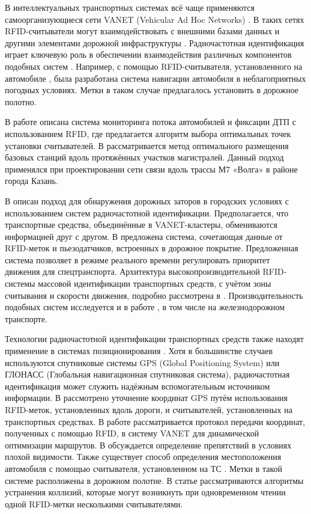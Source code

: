 \documentclass[12pt]{article}
\theoremstyle{definition}
\begin{document}
В интеллектуальных транспортных системах всё чаще применяются самоорганизующиеся сети VANET (Vehicular Ad Hoc Networks) \cite{Al-Shareeda2023, Vishn2016_2}. В таких сетях RFID-считыватели могут взаимодействовать с внешними базами данных и другими элементами дорожной инфраструктуры \cite{Vishn2016, F.Zhu2020}. Радиочастотная идентификация играет ключевую роль в обеспечении взаимодействия различных компонентов подобных систем \cite{Zhang2018, Zhang2019, Shirabur2020, Pawowicz2020, Vishn2013, Vishnevsky2022, Larionov2017, Larionov2018, Vishnevsky2012}. Например, с помощью RFID-считывателя, установленного на автомобиле \cite{CastroGonzalez2025}, была разработана система навигации автомобиля в неблагоприятных погодных условиях. Метки в таком случае предлагалось установить в дорожное полотно.

В работе \cite{Zhang2018} описана система мониторинга потока автомобилей и фиксации ДТП с использованием RFID, где предлагается алгоритм выбора оптимальных точек установки считывателей. В \cite{Amir2022, Vishn2016, Vishn228} рассматривается метод оптимального размещения базовых станций вдоль протяжённых участков магистралей. Данный подход применялся при проектировании сети связи вдоль трассы М7 «Волга» в районе города Казань.

В \cite{Zhang2019} описан подход для обнаружения дорожных заторов в городских условиях с использованием систем радиочастотной идентификации. Предполагается, что транспортные средства, объединённые в VANET-кластеры, обмениваются информацией друг с другом. В \cite{Shirabur2020} предложена система, сочетающая данные от RFID-меток и пьезодатчиков, встроенных в дорожное покрытие. Предложенная система позволяет в режиме реального времени регулировать приоритет движения для спецтранспорта. Архитектура высокопроизводительной RFID-системы массовой идентификации транспортных средств, с учётом зоны считывания и скорости движения, подробно рассмотрена в \cite{Pawowicz2020}. Производительность подобных систем исследуется и в работе \cite{Unterhuber2020}, в том числе на железнодорожном транспорте.

Технологии радиочастотной идентификации транспортных средств также находят применение в системах позиционирования \cite{Zhang2025, Ajroud2025, Yang2024, Stefanov2026}. Хотя в большинстве случаев используются спутниковые системы GPS (Global Positioning System) или ГЛОНАСС (Глобальная навигационная спутниковая система), радиочастотная идентификация может служить надёжным вспомогательным источником информации. В \cite{Zheng2018} рассмотрено уточнение координат GPS путём использования RFID-меток, установленных вдоль дороги, и считывателей, установленных на транспортных средствах. В работе \cite{Lu2021} рассматривается протокол передачи координат, полученных с помощью RFID, в систему VANET для динамической оптимизации маршрутов. В \cite{Garcia2018} обсуждается определение препятствий в условиях плохой видимости. Также существует способ определения местоположения автомобиля с помощью считывателя, установленном на ТС \cite{Qin2021}. Метки в такой системе расположены в дорожном полотне. В статье рассматриваются алгоритмы устранения коллизий, которые могут возникнуть при одновременном чтении одной RFID-метки несколькими считывателями.
\end{document}
